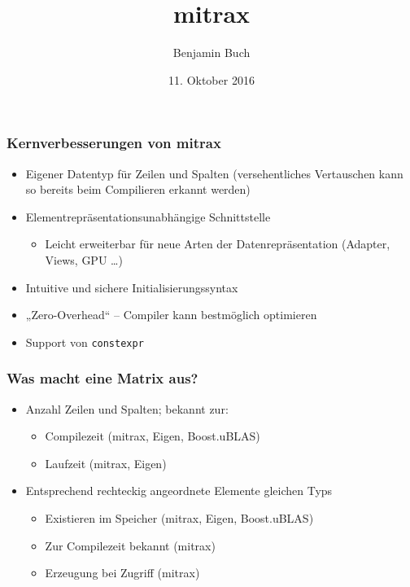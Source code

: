 \documentclass{beamer}
\title{mitrax}
\author{Benjamin Buch}
\date{11. Oktober 2016}
\begin{document}
\begin{frame}
    \frametitle{Kernverbesserungen von mitrax}
    \begin{itemize}
        \item Eigener Datentyp für Zeilen und Spalten (versehentliches Vertauschen kann so bereits beim Compilieren erkannt werden)
        \item Elementrepräsentationsunabhängige Schnittstelle
        \begin{itemize}
            \item Leicht erweiterbar für neue Arten der Datenrepräsentation (Adapter, Views, GPU …)
        \end{itemize}
        \item Intuitive und sichere Initialisierungssyntax
        \item „Zero-Overhead“ – Compiler kann bestmöglich optimieren
        \item Support von \texttt{constexpr}
    \end{itemize}
\end{frame}
\begin{frame}
    \frametitle{Was macht eine Matrix aus?}
    \begin{itemize}
        \item Anzahl Zeilen und Spalten; bekannt zur:
        \begin{itemize}
            \item Compilezeit (mitrax, Eigen, Boost.uBLAS)
            \item Laufzeit (mitrax, Eigen)
        \end{itemize}
        \item Entsprechend rechteckig angeordnete Elemente gleichen Typs
        \begin{itemize}
            \item Existieren im Speicher (mitrax, Eigen, Boost.uBLAS)
            \item Zur Compilezeit bekannt (mitrax)
            \item Erzeugung bei Zugriff (mitrax)
        \end{itemize}
    \end{itemize}
\end{frame}
\end{document}
